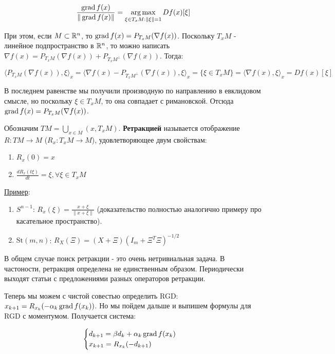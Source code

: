 $$
\frac{\operatorname{grad} f(x)}{\|\operatorname{grad} f(x)\|} = \operatorname*{arg\,max}_{\xi \in T_x M: \|\xi\| = 1} D f(x) [\xi]
$$

\noindent
При этом, если $M \subset \mathbb{R}^n$, то $\operatorname{grad} f(x) = P_{T_x M} (\nabla f(x))$. Поскольку $T_x M$ - линейное подпространство в $\mathbb{R}^n$, то можно написать $\nabla f(x) = P_{T_x M} (\nabla f(x)) + P_{{T_x M}^\bot} (\nabla f(x))$. Тогда:

$$
\big\langle P_{T_x M} (\nabla f(x)), \xi \big\rangle_x = \Big\langle \nabla f(x) - P_{{T_x M}^\bot} (\nabla f(x)), \xi \Big\rangle_x = \big\{\xi \in T_x M\big\} = \big\langle \nabla f(x), \xi \big\rangle_x = D f(x) [\xi]
$$

\noindent
В последнем равенстве мы получили производную по направлению в евклидовом смысле, но поскольку $\xi \in T_x M$, то она совпадает с римановской. Отсюда $\operatorname{grad} f(x) = P_{T_x M} (\nabla f(x))$.

Обозначим $TM = \bigcup_{x \in M} (x, T_x M)$. \textbf{Ретракцией} называется отображение $R: TM \rightarrow M$ ($R_x: T_x M \rightarrow M$), удовлетворяющее двум свойствам:

\begin{enumerate}
    \item $R_x(0) = x$
    \item $\displaystyle\frac{dR_x(t\xi)}{dt} = \xi, \forall \xi \in T_x M$
\end{enumerate}

\underline{Пример}:
\begin{enumerate}
    \item $S^{n-1}$: $R_x(\xi) = \frac{x + \xi}{\|x + \xi\|}$ (доказательство полностью аналогично примеру про касательное пространство).
    \item $\text{St}(m, n)$: $R_X(\Xi) = (X + \Xi) (I_m + \Xi^T \Xi)^{-1/2}$
\end{enumerate}

\noindent
В общем случае поиск ретракции - это очень нетривиальная задача. В частоности, ретракция определена не единственным образом. Периодически выходят статьи с предложениями разных операторов ретракции.

Теперь мы можем с чистой совестью определить RGD: $x_{k+1} = R_{x_k} (-\alpha_k \operatorname{grad} f(x_k))$. Но мы пойдем дальше и выпишем формулы для RGD с моментумом. Получается система:

$$
\begin{cases}
    d_{k+1} = \beta d_k + \alpha_k \operatorname{grad} f(x_k) \\
    x_{k+1} = R_{x_k} (-d_{k+1})
\end{cases}
$$

